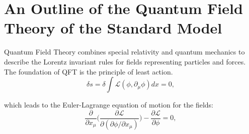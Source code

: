 

\chapter{An Outline of the Quantum Field Theory of the Standard Model}
\label{sec:physics:qft}


Quantum Field Theory combines special relativity and quantum mechanics to describe the Lorentz invariant rules for fields representing particles and forces. The foundation of QFT is the principle of least action.
\begin{equation}
    \delta s = \delta \int \mathcal{L}(\phi, \partial_\mu \phi) dx = 0,
    \label{eqn:physics:qft:leastAction}
\end{equation}

\noindent which leads to the Euler-Lagrange equation of motion for the fields:
\begin{equation}
    \frac{\partial}{\partial x_\mu} \bigg( \frac{\partial \mathcal{L}}{\partial(\partial \phi / \partial x_\mu)}\bigg) - \frac{\partial \mathcal{L}}{ \partial \phi} = 0,
    \label{eqn:physics:qft:lagrangeEoM}
\end{equation}

